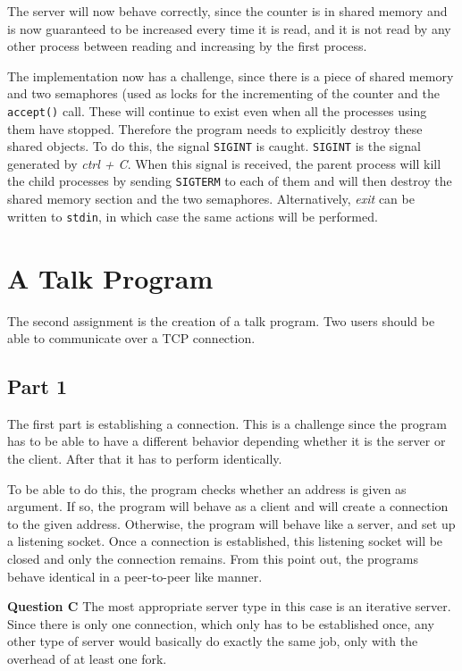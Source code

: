 \documentclass[a4paper]{article}
\begin{document}
The server will now behave correctly, since the counter is in shared memory and is now 
guaranteed to be increased every time it is read, and it is not read by any other process
between reading and increasing by the first process.

The implementation now has a challenge, since there is a piece of shared memory and two
semaphores (used as locks for the incrementing of the counter and the \texttt{accept()}
call. These will continue to exist even when all the processes using them have
stopped. Therefore the program needs to explicitly destroy these shared objects. To do 
this, the signal \texttt{SIGINT} is caught. \texttt{SIGINT} is the signal generated by
\emph{ctrl + C}. When this signal is received, the parent process will kill the child
processes by sending \texttt{SIGTERM} to each of them and will then destroy the shared 
memory section and the two semaphores. Alternatively, \emph{exit} can be written to 
\texttt{stdin}, in which case the same actions will be performed.

\section{A Talk Program}

The second assignment is the creation of a talk program. Two users should be able to
communicate over a TCP connection.

\subsection{Part 1}

The first part is establishing a connection. This is a challenge since the program has to
be able to have a different behavior depending whether it is the server or the client.
After that it has to perform identically.

To be able to do this, the program checks whether an address is given as argument. If so,
the program will behave as a client and will create a connection to the given address.
Otherwise, the program will behave like a server, and set up a listening socket. Once a
connection is established, this listening socket will be closed and only the connection
remains. From this point out, the programs behave identical in a peer-to-peer like manner.

\textbf{Question C} The most appropriate server type in this case is an iterative server.
Since there is only one connection, which only has to be established once, any other type
of server would basically do exactly the same job, only with the overhead of at least one
fork.
\end{document}
